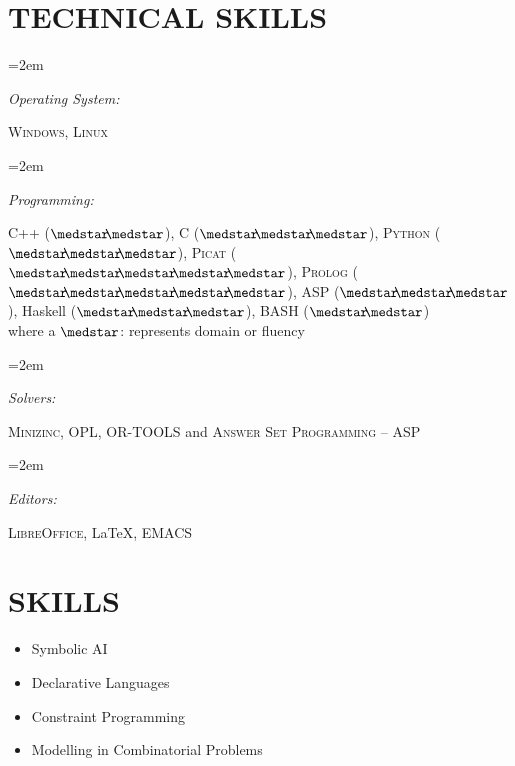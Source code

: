 \documentclass[paper=a4,fontsize=11pt]{scrartcl} %
\newlength{\spacebox}
\newcommand{\NewPart}[1]{\section*{\uppercase{#1}}}
\newcommand{\PersonalEntry}[2]{
		\noindent\hangindent=2em\hangafter=0 %
		\parbox{\spacebox}{        %
		\textit{#1}}		       %
		\hspace{1.5em} #2 \par}    %
\newcommand{\SkillsEntry}[2]{      %
		\noindent\hangindent=2em\hangafter=0 %
		\parbox{\spacebox}{        %
		\textit{#1}}			   %
		\hspace{1.5em} #2 \par}    %
\begin{document}
\NewPart{Technical Skills}{}

\SkillsEntry{Operating System:} {\textsc{Windows}, \textsc{Linux}}

\SkillsEntry{Programming:} {\textsc{C++} ($\medstar\hspace{-1mm}\medstar$), \textsc{C} ($\medstar\hspace{-1mm}\medstar\hspace{-1mm}\medstar$), \textsc{Python} ($\medstar\hspace{-1mm}\medstar\hspace{-1mm}\medstar$), \textsc{Picat} ($\medstar\hspace{-1mm}\medstar\hspace{-1mm}\medstar\hspace{-1mm}\medstar\hspace{-1mm}\medstar$),  \textsc{Prolog} 
($\medstar\hspace{-1mm}\medstar\hspace{-1mm}\medstar\hspace{-1mm}\medstar\hspace{-1mm}\medstar$), ASP
($\medstar\hspace{-1mm}\medstar\hspace{-1mm}\medstar$), Haskell 
($\medstar\hspace{-1mm}\medstar\hspace{-1mm}\medstar$), BASH ($\medstar\hspace{-1mm}\medstar$) \\ where a $\medstar$: represents domain or fluency}

\SkillsEntry{Solvers:} {\textsc{Minizinc}, \textsc{OPL},
 \textsc{OR-TOOLS} and  \textsc{Answer Set Programming -- ASP}}

\SkillsEntry{Editors:} {\textsc{LibreOffice}, \LaTeX, \textsc{EMACS}}



\NewPart{Skills}{}

\begin{itemize}
\setlength\itemsep{-2mm}
\item Symbolic AI
\item Declarative Languages
\item Constraint Programming
\item Modelling in Combinatorial Problems

\end{itemize}

\end{document}
